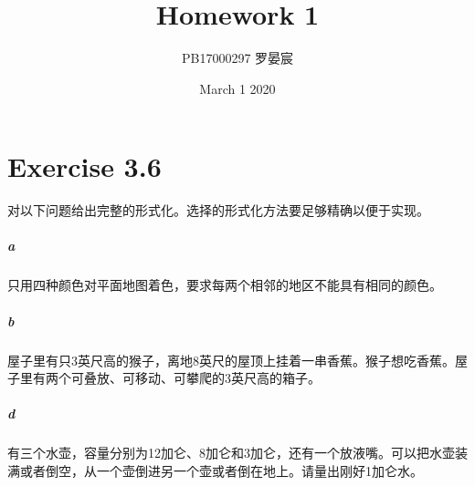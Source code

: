 \documentclass{article}
\title{Homework 1}
\author{PB17000297 罗晏宸}
\date{March 1 2020}
\begin{document}
\maketitle

\section{Exercise 3.6}
对以下问题给出完整的形式化。选择的形式化方法要足够精确以便于实现。
\subparagraph{a}
只用四种颜色对平面地图着色，要求每两个相邻的地区不能具有相同的颜色。
\subparagraph{b}
屋子里有只3英尺高的猴子，离地8英尺的屋顶上挂着一串香蕉。猴子想吃香蕉。屋子里有两个可叠放、可移动、可攀爬的3英尺高的箱子。
\subparagraph{d}
有三个水壶，容量分别为12加仑、8加仑和3加仑，还有一个放液嘴。可以把水壶装满或者倒空，从一个壶倒进另一个壶或者倒在地上。请量出刚好1加仑水。
\end{document}
